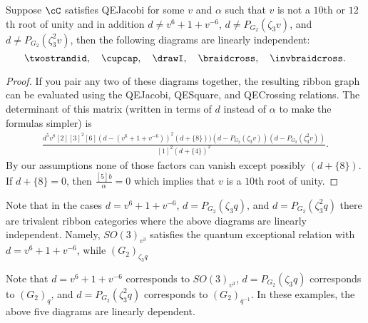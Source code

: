 \documentclass[12pt]{amsart}
\begin{document}
\begin{lemma} \label{lem:lin-ind-w}
Suppose $\cC$ satisfies QEJacobi for some $v$ and $\alpha$ such that $v$ is
not a $10$th or $12$th root of unity and in addition $d \neq v^6+1+v^{-6}$, $d
\neq P_{G_2}(\zeta_3 v)$, and $d \neq P_{G_2}(\zeta_3^2 v)$, then the
following diagrams are linearly independent:
$$\twostrandid,\quad \cupcap,\quad \drawI,\quad\braidcross,\quad\invbraidcross.$$
\end{lemma}
\begin{proof}
If you pair any two of these diagrams together, the resulting ribbon graph can
be evaluated using the QEJacobi, QESquare, and QECrossing relations.  The
determinant of this matrix (written in terms of $d$ instead of $\alpha$ to
make the formulas simpler) is
\begin{align*}
\frac
{
d^5 v^8 [2][3]^2[6] (d-(v^{6}+1+v^{-6}))^2 (d + \{8\})) (d-P_{G_2}(\zeta_3 v)) (d-P_{G_2}(\zeta_3^2 v))
}
{
[1]^{2}(d + \{4\})^{2}
}.
\end{align*}
By our assumptions none of those factors can vanish except possibly
$(d+\{8\})$.  If $d+\{8\} = 0$, then $\frac{[5]b}{\alpha} = 0$ which implies
that $v$ is a $10$th root of unity.
\end{proof}

\begin{remark}
Note that in the cases $d = v^6+1+v^{-6}$, $d=P_{G_2}(\zeta_3 q)$, and 
$d=P_{G_2}(\zeta_3^2 q)$ there are trivalent ribbon categories where the
above diagrams are linearly independent.  Namely, $SO(3)_{v^3}$ satisfies
the quantum exceptional relation with $d = v^6+1+v^{-6}$, while 
$(G_2)_{\zeta_3 q}$

Note that $d = v^6+1+v^{-6}$ corresponds to $SO(3)_{v^3}$, $d=P_{G_2}(\zeta_3 q)$ 
corresponds to $(G_2)_{q}$, and $d=P_{G_2}(\zeta_3^2 q)$ corresponds to
$(G_2)_{q^{-1}}$.  In these examples, the above five diagrams are linearly
dependent.  
\end{remark}

\end{document}
